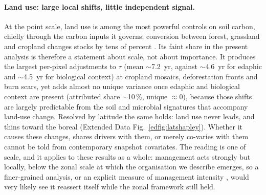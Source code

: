 \documentclass[12pt, a4paper]{article}
\begin{document}
\paragraph{Land use: large local shifts, little independent signal.}
At the point scale, land use is among the most powerful controls on soil carbon,
chiefly through the carbon inputs it governs; conversion between forest, grassland
and cropland changes stocks by tens of percent \citep{GuoGifford2002,Sanderman2017}.
Its faint share in the present analysis is therefore a statement about scale, not
about importance. It produces the largest per-pixel adjustments to
$\tau$ (mean $\sim$7.2~yr, against $\sim$4.6~yr for edaphic and $\sim$4.5~yr for
biological context) at cropland mosaics, deforestation fronts and burn scars, yet
adds almost no unique variance once edaphic and biological context are present
(attributed share $\sim$10\,\%, unique $\approx0$), because those shifts are largely
predictable from the soil and microbial signatures that accompany land-use change.
Resolved by latitude the same holds: land use never leads, and thins toward the boreal
(Extended Data Fig.~\ref{edfig:latshapley}). Whether it causes these changes, shares
drivers with them, or merely co-varies with them cannot be told from contemporary
snapshot covariates. The reading is one of scale, and it applies to these results as a
whole: management acts strongly but locally, below the zonal scale at which the
organisation we describe emerges, so a finer-grained analysis, or an explicit measure of
management intensity \citep{Suvanto2025}, would very likely see it
reassert itself while the zonal framework still held.


\end{document}
